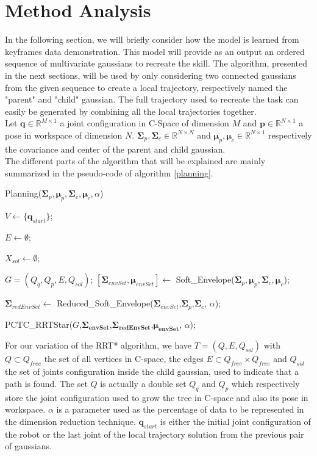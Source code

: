 \documentclass[letterpaper, 10 pt, conference]{ieeeconf}  %
\newcommand{\mb}[1]{{\boldsymbol{#1}}}
\begin{document}
\section{Method Analysis}
In the following section, we will briefly consider how the model is learned from keyframes data demonstration. This model will provide as an output an ordered sequence of multivariate gaussians to recreate the skill. The algorithm, presented in the next sections, will be used by only considering two connected gaussians from the given sequence to create a local trajectory, respectively named the "parent" and "child" gaussian. The full trajectory used to recreate the task can easily be generated by combining all the local trajectories together.
\\
Let $\mb{q} \in \mathbb{R}^{M \times 1}$ a joint configuration in C-Space of dimension $M$  and $\mb{p} \in \mathbb{R}^{N \times 1}$ a pose in workspace of dimension $N$. $\mb{\Sigma}_{p} , \mb{\Sigma}_{c} \in \mathbb{R}^{N \times N}$  and $\mb{\mu}_{p} , \mb{\mu}_{c} \in \mathbb{R}^{N \times 1}$ respectively the covariance and center of the parent and child gaussian.\\
The different parts of the algorithm that will be explained are mainly summarized in the pseudo-code of algorithm \ref{planning}. 
\begin{algorithm}[H]
 \caption{Planning($\mb{\Sigma}_p,\mb{\mu}_p,\mb{\Sigma}_c,\mb{\mu}_c,\alpha$)}\label{planning}

\BlankLine
\setcounter{AlgoLine}{0}
$V \leftarrow \{
\mb{q}_{start}\}$;

$E \leftarrow \emptyset$;

$X_{sol} \leftarrow \emptyset$;

$G=(Q_q,Q_p,E,Q_{sol})$;
\BlankLine
$[\mb{\Sigma}_{envSet},\mb{\mu}_{envSet}] \leftarrow$ Soft\_Envelope($\mb{\Sigma}_p,\mb{\mu}_p,\mb{\Sigma}_c,\mb{\mu}_c$);

$\mb{\Sigma}_{redEnvSet} \leftarrow$ Reduced\_Soft\_Envelope($\mb{\Sigma}_{envSet}$,$\mb{\Sigma}_{p}$,$\mb{\Sigma}_{c}$, $\alpha$);

\BlankLine
PCTC\_RRTStar($G$,$\mb{\Sigma_{envSet}}$,$\mb{\Sigma_{redEnvSet}}$,$\mb{\mu_{envSet}}$, $\alpha$);

\end{algorithm}
For our variation of the RRT* algorithm, we have $T=(Q,E,Q_{sol})$ with $Q \subset Q_{free}$ the set of all vertices in C-space, the edges $E \subset Q_{free} \times Q_{free}$ and $Q_{sol}$ the set of joints configuration inside the child gaussian, used to indicate that a path is found. The set $Q$ is actually a double set $Q_q$ and $Q_p$ which respectively store the joint configuration used to grow the tree in C-space and also its pose in workspace. $\alpha$ is a parameter used as the percentage of data to be represented in the dimension reduction technique. $\mb{q}_{start}$ is either the initial joint configuration of the robot or the last joint of the local trajectory solution from the previous pair of gaussians. 
\end{document}
